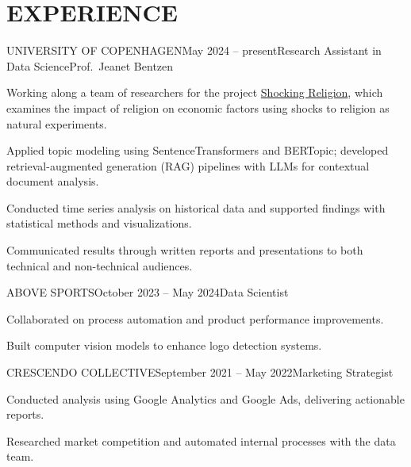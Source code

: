 \documentclass{resume}
\begin{document}
\section{EXPERIENCE}
\begin{content}

    \begin{position}{UNIVERSITY OF COPENHAGEN}{May 2024 -- present}{Research Assistant in Data Science}{Prof.~Jeanet Bentzen}
        \item Working along a team of researchers for the project {\href{https://www.economics.ku.dk/research/externally-funded-research_new/shocking-religion/}{Shocking Religion}}, which examines the impact of religion on economic factors using shocks to religion as natural experiments.
        \item 
        \item Applied topic modeling using SentenceTransformers and BERTopic; developed retrieval-augmented generation (RAG) pipelines with LLMs for contextual document analysis.
        \item Conducted time series analysis on historical data and supported findings with statistical methods and visualizations.
        \item Communicated results through written reports and presentations to both technical and non-technical audiences.
    \end{position}

    \begin{position}{ABOVE SPORTS}{October 2023 -- May 2024}{Data Scientist}{}{}
        \item Collaborated on process automation and product performance improvements.
        \item Built computer vision models to enhance logo detection systems.
    \end{position}

    \begin{position}{CRESCENDO COLLECTIVE}{September 2021 -- May 2022}{Marketing Strategist}{}{}
        \item Conducted analysis using Google Analytics and Google Ads, delivering actionable reports.
        \item Researched market competition and automated internal processes with the data team.
    \end{position}

\end{content}

\end{document}
